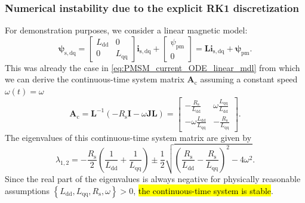 \begin{frame}
    \frametitle{Numerical instability due to the explicit RK1 discretization}
    For demonstration purposes, we consider a linear magnetic model:
    $$
        \bm{\psi}_\mathrm{s,dq} = \begin{bmatrix}
            L_{\mathrm{dd}} & 0               \\
            0               & L_{\mathrm{qq}}
        \end{bmatrix}\bm{i}_\mathrm{s,dq} + \begin{bmatrix}
            \psi_\mathrm{pm} \\
            0
        \end{bmatrix} = \bm{L}\bm{i}_\mathrm{s,dq} + \bm{\psi}_\mathrm{pm}.
    $$\pause%
    This was already the case in \eqref{eq:PMSM_current_ODE_linear_mdl} from which we can derive the continuous-time system matrix $\bm{A}_\mathrm{c}$ assuming a constant speed $\omega(t) = \omega$
    \begin{equation}
        \bm{A}_\mathrm{c}  = \bm{L}^{-1}\left(-R_\mathrm{s}\bm{I}-\omega\bm{J}\bm{L}\right) = \begin{bmatrix}
            -\frac{R_\mathrm{s}}{L_{\mathrm{dd}}}          & \omega\frac{L_{\mathrm{qq}}}{L_{\mathrm{dd}}} \\[1ex]
            -\omega\frac{L_{\mathrm{dd}}}{L_{\mathrm{qq}}} & -\frac{R_\mathrm{s}}{L_{\mathrm{qq}}}
        \end{bmatrix}.
    \end{equation}\pause%
    The eigenvalues of this continuous-time system matrix are given by
    \begin{equation}
        \lambda_{1,2} = -\frac{R_\mathrm{s}}{2}\left(\frac{1}{L_{\mathrm{dd}}}+\frac{1}{L_{\mathrm{qq}}}\right) \pm \frac{1}{2}\sqrt{\left(\frac{R_\mathrm{s}}{L_{\mathrm{dd}}}-\frac{R_\mathrm{s}}{L_{\mathrm{qq}}}\right)^2 - 4\omega^2}.
    \end{equation}\pause%
    Since the real part of the eigenvalues is always negative for physically reasonable assumptions $\left\{L_{\mathrm{dd}}, L_{\mathrm{qq}}, R_\mathrm{s}, \omega \right\}> 0$, \hl{the continuous-time system is stable}.
\end{frame}


